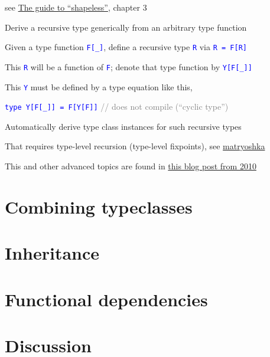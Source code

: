 see \href{https://github.com/underscoreio/shapeless-guide}{The guide to ``shapeless''},
chapter 3

Derive a recursive type generically from an arbitrary type function

Given a type function \texttt{\textcolor{blue}{\footnotesize{}F{[}\_{]}}},
define a recursive type \texttt{\textcolor{blue}{\footnotesize{}R}}
via \texttt{\textcolor{blue}{\footnotesize{}R = F{[}R{]}}}{\footnotesize\par}

This \texttt{\textcolor{blue}{\footnotesize{}R}} will be a function
of \texttt{\textcolor{blue}{\footnotesize{}F}}; denote that type function
by \texttt{\textcolor{blue}{\footnotesize{}Y{[}F{[}\_{]}{]}}}{\footnotesize\par}

This \texttt{\textcolor{blue}{\footnotesize{}Y}} must be defined by
a type equation like this,

\texttt{\textcolor{blue}{\footnotesize{}type Y{[}F{[}\_{]}{]} = F{[}Y{[}F{]}{]}}}\textcolor{gray}{\footnotesize{}
// does not compile (``cyclic type'')}{\footnotesize\par}

Automatically derive type class instances for such recursive types

That requires type-level recursion (type-level fixpoints), see \href{https://github.com/slamdata/matryoshka}{matryoshka}

This and other advanced topics are found in \href{https://apocalisp.wordpress.com/2010/06/08/type-level-programming-in-scala/}{this blog post from 2010}

\section{Combining typeclasses}

\section{Inheritance}

\section{Functional dependencies}

\section{Discussion}

